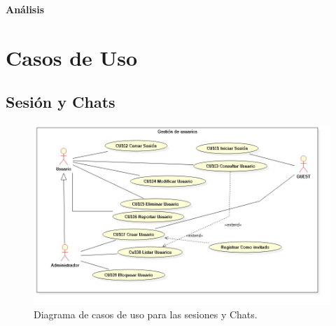 \newpage{\pagestyle{empty}\cleardoublepage}
\newpage
\vspace*{\fill}
    \begin{center}
      \thispagestyle{empty} \vspace*{0cm} \textbf{\huge
An\'{a}lisis}
    \end{center}
    \vspace*{\fill}
\newpage{\pagestyle{empty}\cleardoublepage}
\chapter{Casos de Uso}
\section{Sesi\'{o}n y Chats}

\begin{figure}[h]
\centering
\includegraphics[width=1\textwidth]{Img/CasosDeUso/DCU01.jpg}
\caption{Diagrama de casos de uso para las sesiones y Chats.}
\label{fig:dcu}
\end{figure}
